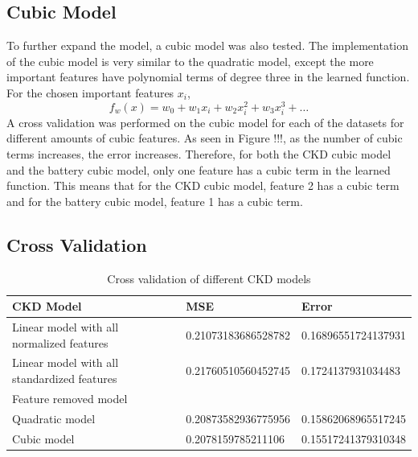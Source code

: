\documentclass{article}
\begin{document}
\subsection{Cubic Model}

To further expand the model, a cubic model was also tested.   The implementation of the cubic model is very similar to the quadratic model, except the more important features have polynomial terms of degree three in the learned function.  For the chosen important features $x_i$,
\begin{equation}
  f_w (x) = w_0 + w_1 x_i + w_2 x^2_i + w_3 x^3_i + \dots
\end{equation}
A cross validation was performed on the cubic model for each of the datasets for different amounts of cubic features.  
As seen in Figure !!!, as the number of cubic terms increases, the error increases.  Therefore, for both the CKD cubic model and the battery cubic model, only one feature has a cubic term in the learned function.  
This means that for the CKD cubic model, feature 2 has a cubic term and for the battery cubic model, feature 1 has a cubic term. 

\subsection{Cross Validation}

\begin{table}[h!]
  \centering
  \caption{Cross validation of different CKD models}
  \begin{tabular}{|l|l|l|}
  \hline
  \textbf{CKD Model}                               & \textbf{MSE}                  & \textbf{Error}               \\ \hline
  Linear model with all normalized features        & 0.21073183686528782           & 0.16896551724137931          \\ \hline
  Linear model with all standardized features      & 0.21760510560452745           & 0.1724137931034483           \\ \hline
  Feature removed model                            &             &           \\ \hline
  Quadratic model                                  & 0.20873582936775956           & 0.15862068965517245          \\ \hline
  Cubic model                                      & 0.2078159785211106            & 0.15517241379310348          \\ \hline
  \end{tabular}
\end{table}
\end{document}
